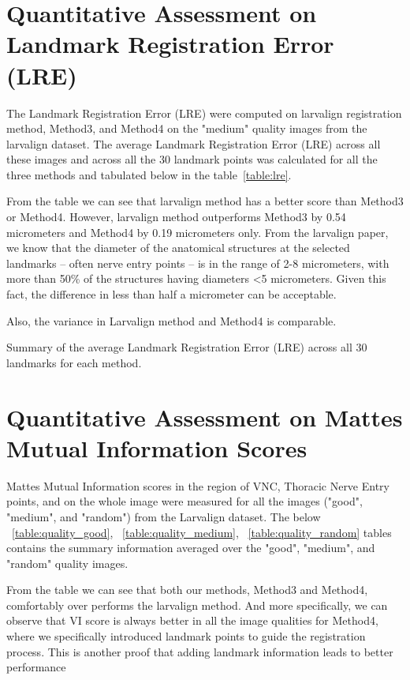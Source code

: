 \documentclass{report}
\begin{document}
	\section{Quantitative Assessment on Landmark Registration Error (LRE)}
	The Landmark Registration Error (LRE) were computed on larvalign registration method, Method3, and Method4 on the "medium" quality images from the larvalign dataset. The average Landmark Registration Error (LRE) across all these images and across all the 30 landmark points was calculated for all the three methods and tabulated below in the table~\ref{table:lre}.
	
	From the table we can see that larvalign method has a better score than Method3 or Method4. However, larvalign method outperforms Method3 by 0.54 micrometers and Method4 by 0.19 micrometers only. From the larvalign paper, we know that the diameter of the anatomical structures at the selected landmarks – often nerve entry points – is in the range of 2-8 micrometers, with more than 50\% of the structures having diameters \textless 5 micrometers. Given this fact, the difference in less than half a micrometer can be acceptable.
	
	Also, the variance in Larvalign method and Method4 is comparable.
	
	\begin{table}[h]
		\centering
		
		\caption{Summary of the average Landmark Registration Error (LRE) across all 30 landmarks for each method.}
		\label{table:lre}
	\end{table}

	\section{Quantitative Assessment on Mattes Mutual Information Scores}
	Mattes Mutual Information scores in the region of VNC, Thoracic Nerve Entry points, and on the whole image were measured for all the images ("good", "medium", and "random") from the Larvalign dataset. The below ~\ref{table:quality_good}, ~\ref{table:quality_medium}, ~\ref{table:quality_random} tables contains the summary information averaged over the "good", "medium", and "random" quality images.
	
	From the table we can see that both our methods, Method3 and Method4, comfortably over performs the larvalign method. And more specifically, we can observe that VI score is always better in all the image qualities for Method4, where we specifically introduced landmark points to guide the registration process. This is another proof that adding landmark information leads to better performance
	
\end{document}

